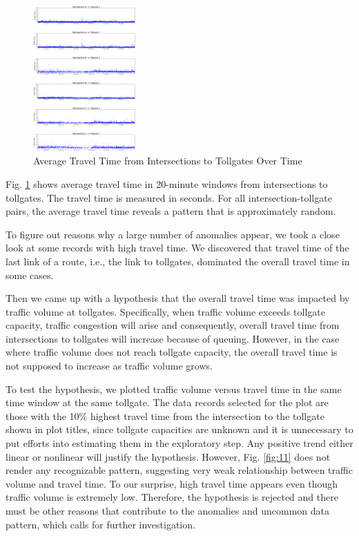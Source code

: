 \documentclass[journal, letterpaper]{IEEEtran}
\begin{document}
\begin{figure} [H]
  \centering
  \includegraphics[width=0.35\textwidth]{intersection-tollgate-time-2.png}
  \caption{Average Travel Time from Intersections to Tollgates Over Time}
  \captionsetup{justification=centering}
  \label{fig:10}
\end{figure}

Fig. \ref{fig:10} shows average travel time in 20-minute windows from intersections to tollgates. The travel time is measured in seconds. For all intersection-tollgate pairs, the average travel time reveals a pattern that is approximately random.

To figure out reasons why a large number of anomalies appear, we took a close look at some records with high travel time. We discovered that travel time of the last link of a route, i.e., the link to tollgates, dominated the overall travel time in some cases.

Then we came up with a hypothesis that the overall travel time was impacted by traffic volume at tollgates. Specifically, when traffic volume exceeds tollgate capacity, traffic congestion will arise and consequently, overall travel time from intersections to tollgates will increase because of queuing. However, in the case where traffic volume does not reach tollgate capacity, the overall travel time is not supposed to increase as traffic volume grows.

To test the hypothesis, we plotted traffic volume versus travel time in the same time window at the same tollgate. The data records selected for the plot are those with the 10\% highest travel time from the intersection to the tollgate shown in plot titles, since tollgate capacities are unknown and it is unnecessary to put efforts into estimating them in the exploratory step. Any positive trend either linear or nonlinear will justify the hypothesis. However, Fig. \ref{fig:11} does not render any recognizable pattern, suggesting very weak relationship between traffic volume and travel time. To our surprise, high travel time appears even though traffic volume is extremely low. Therefore, the hypothesis is rejected and there must be other reasons that contribute to the anomalies and uncommon data pattern, which calls for further investigation.
\end{document}
